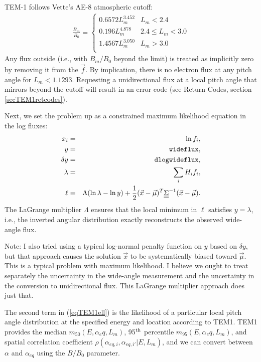 \documentclass{article}    %
\newcommand{\dbul}[1]{\underline{\underline{#1}}}
\begin{document}
TEM-1 follows Vette's AE-8 atmospheric cutoff:
\begin{eqnarray}
\frac{B_m}{B_0} = \left\{
\begin{array}{cl}
0.6572 L_m^{3.452} & L_m < 2.4 \\
0.196 L_m^{4.878} & 2.4 \le L_m < 3.0 \\
1.4567 L_m^{3.050} & L_m >3.0 \\
\end{array}
\right.
\end{eqnarray}
Any flux outside (i.e., with $B_m/B_0$ beyond the limit) is treated as
implicitly zero by removing it from the $\vec{f}$.  By implication,
there is no electron flux at any pitch angle for $L_m < 1.1293$.
Requesting a unidirectional flux at a local pitch angle that mirrors
beyond the cutoff will result in an error code (see Return Codes,
section \ref{secTEM1retcodes}).

Next, we set the problem up as a constrained maximum likelihood equation in the log fluxes:
\begin{eqnarray}
x_i &=& \ln f_i, \\
y &=& \verb|wideflux|, \\
\delta y &=& \verb|dlogwideflux|, \\
\lambda &=& \sum_i H_i f_i, \\
\ell &=& \Lambda(\ln\lambda-\ln y) + \frac{1}{2}(\vec{x}-\vec{\mu})^T \dbul{\Sigma}^{-1} (\vec{x}-\vec{\mu}). \label{eqTEM1ell}
\end{eqnarray}
The LaGrange multiplier $\Lambda$ ensures that the local minimum in
$\ell$ satisfies $y=\lambda$, i.e., the inverted angular distribution
exactly reconstructs the observed wide-angle flux. 

Note: I also tried using a typical log-normal penalty function on $y$
based on $\delta y$, but that approach causes the solution $\vec{x}$
to be systematically biased toward $\vec{\mu}$. This is a typical
problem with maximum likelihood. I believe we ought to treat
separately the uncertainty in the wide-angle measurement and the
uncertainty in the conversion to unidirectional flux. This LaGrange
multiplier approach does just that.

The second term in (\ref{eqTEM1ell}) is the likelihood of a particular
local pitch angle distribution at the specified energy and location
according to TEM1. TEM1 provides the median $m_{50}(E,\alpha_eq,L_m)$,
95$^{\rm th}$ percentile $m_{95}(E,\alpha_eq,L_m)$, and spatial
correlation coefficient $\rho(\alpha_{eq,i},\alpha_{eq,i'}|E,L_m)$,
and we can convert between $\alpha$ and $\alpha_{eq}$ using the
$B/B_0$ parameter.
\end{document}
